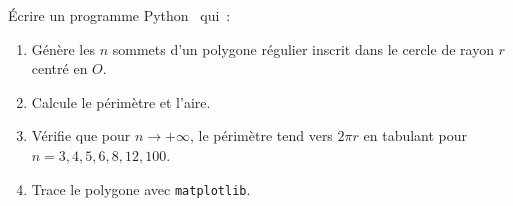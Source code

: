 \begin{bilan}
\begin{challenge}
\'Ecrire un programme Python \computer\ qui~:
\begin{enumerate}
  \item G\'en\`ere les $n$ sommets d'un polygone r\'egulier inscrit
        dans le cercle de rayon $r$ centr\'e en $O$.
  \item Calcule le p\'erim\`etre et l'aire.
  \item V\'erifie que pour $n\to+\infty$, le p\'erim\`etre tend vers $2\pi r$
        en tabulant pour $n=3,4,5,6,8,12,100$.
  \item Trace le polygone avec \texttt{matplotlib}.
\end{enumerate}
\end{challenge}

\end{bilan}


